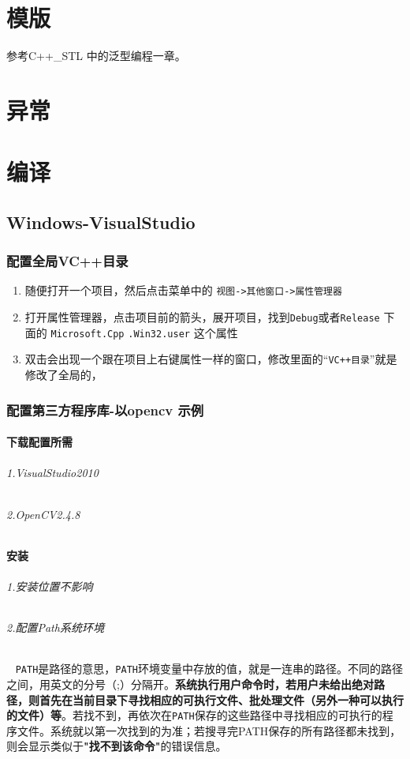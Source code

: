 \documentclass[UTF8,a4paper,12pt]{ctexbook} %
\begin{document}
\chapter{模版}
	参考C++\_STL 中的泛型编程一章。
	
\chapter{异常}
	
		
\chapter{编译}
	\section{Windows-VisualStudio}
		\subsection{配置全局VC++目录}
			\begin{enumerate}
				\item  随便打开一个项目，然后点击菜单中的 \verb|视图->其他窗口->属性管理器|
				
				\item  打开属性管理器，点击项目前的箭头，展开项目，找到\verb|Debug|或者\verb|Release| 下面的 \verb|Microsoft.Cpp| \verb|.Win32.user| 这个属性
				
				\item  双击会出现一个跟在项目上右键属性一样的窗口，修改里面的“\verb|VC++目录|”就是修改了全局的，
			\end{enumerate}
		\subsection{配置第三方程序库-以opencv 示例}
			\subsubsection{下载配置所需}
				\subparagraph{1.VisualStudio2010}
				\subparagraph{2.OpenCV2.4.8}
			
			\subsubsection{安装}
				\subparagraph{1.安装位置不影响}
				\subparagraph{2.配置Path系统环境}	
				  \verb|PATH|是路径的意思，\verb|PATH|环境变量中存放的值，就是一连串的路径。不同的路径之间，用英文的分号（;）分隔开。\textbf{系统执行用户命令时，若用户未给出绝对路径，则首先在当前目录下寻找相应的可执行文件、批处理文件（另外一种可以执行的文件）等}。若找不到，再依次在\verb|PATH|保存的这些路径中寻找相应的可执行的程序文件。系统就以第一次找到的为准；若搜寻完PATH保存的所有路径都未找到，则会显示类似于\textbf{"找不到该命令"}的错误信息。
			
\end{document}

